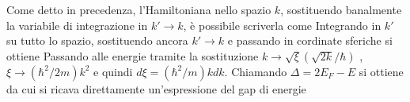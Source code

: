 Come detto in precedenza, l'Hamiltoniana nello spazio $k$, sostituendo banalmente la variabile di integrazione in $k' \to k$, \`e possibile scriverla come
Integrando in $k'$ su tutto lo spazio, sostituendo ancora $k'\to k$ e passando in cordinate sferiche si ottiene
Passando alle energie tramite la sostituzione $k\to\sqrt{\xi}(\sqrt{2k}/\hbar)$ , $\xi \to (\hbar^2/2m) k^2$ e quindi $d\xi = (\hbar^2/m) k dk$. Chiamando $\Delta = 2E_F - E$ si ottiene
da cui si ricava direttamente un'espressione del gap di energie













